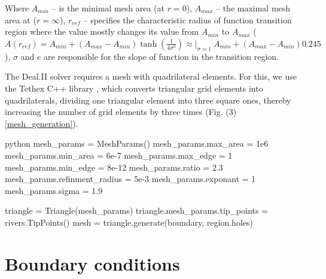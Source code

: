 \documentclass[]{pracamgr}
\begin{document}
      Where $A_{min}$ -- is the minimal mesh area (at $r = 0$), $A_{max}$ -- the maximal mesh area at ($r = \infty$), $r_{ref}$ -- specifies the characteristic radius of function transition region where the value mostly changes its value from $A_{min}$ to $A_{max}$ ($A(r_{ref}) =  A_{min} + (A_{max} - A_{min}) \tanh(\frac{1}{4 \sigma^2}) \approx |_{\sigma = 1} \ A_{min} + (A_{max} - A_{min}) 0.245 $), $\sigma$ and $e$ are responsible for the slope of function in the transition region.

      The Deal.II\cite{dealII94} solver requires a mesh with quadrilateral elements. For this, we use the Tethex C++ library \cite{tethex}, which converts triangular grid elements into quadrilaterals, dividing one triangular element into three square ones, thereby increasing the number of grid elements by three times (Fig. (3) \ref{mesh_generation}).

      \begin{mintedbox}{python}
        mesh_params = MeshParams()
        mesh_params.max_area = 1e6
        mesh_params.min_area = 6e-7
        mesh_params.max_edge = 1
        mesh_params.min_edge = 8e-12
        mesh_params.ratio = 2.3
        mesh_params.refinment_radius = 5e-3
        mesh_params.exponant = 1
        mesh_params.sigma = 1.9
      
        triangle = Triangle(mesh_params)
        triangle.mesh_params.tip_points = rivers.TipPoints()
        mesh = triangle.generate(boundary, region.holes)\end{mintedbox}

    \section{Boundary conditions}
\end{document}
